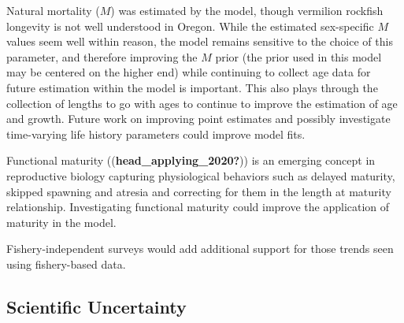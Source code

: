 \documentclass[11pt,
  english,
  a4paper,
]{article}
\begin{document}
\leavevmode\tagmcend\tagstructend


Natural mortality ({\(M\)\leavevmode\tagmcend\tagstructend}) was estimated by the model, though vermilion rockfish longevity is not well understood in Oregon. While the estimated sex-specific {\(M\)\leavevmode\tagmcend\tagstructend} values seem well within reason, the model remains sensitive to the choice of this parameter, and therefore improving the {\(M\)\leavevmode\tagmcend\tagstructend} prior (the prior used in this model may be centered on the higher end) while continuing to collect age data for future estimation within the model is important. This also plays through the collection of lengths to go with ages to continue to improve the estimation of age and growth. Future work on improving point estimates and possibly investigate time-varying life history parameters could improve model fits.

\leavevmode\tagmcend\tagstructend\par


Functional maturity ({(\textbf{head\_applying\_2020?})\leavevmode\tagmcend\tagstructend}) is an emerging concept in reproductive biology capturing physiological behaviors such as delayed maturity, skipped spawning and atresia and correcting for them in the length at maturity relationship. Investigating functional maturity could improve the application of maturity in the model.

\leavevmode\tagmcend\tagstructend\par


Fishery-independent surveys would add additional support for those trends seen using fishery-based data.

\leavevmode\tagmcend\tagstructend\par


\hypertarget{scientific-uncertainty}{%
\subsection*{Scientific Uncertainty}\label{scientific-uncertainty}}
\end{document}
